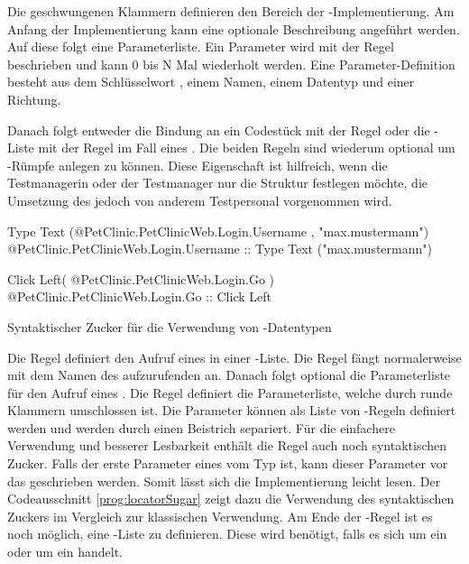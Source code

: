 \SuperPar
Die geschwungenen Klammern definieren den Bereich der -Implementierung. Am Anfang der Implementierung kann eine optionale Beschreibung angeführt werden. Auf diese folgt eine Parameterliste. Ein Parameter wird mit der Regel  beschrieben und kann 0 bis N Mal wiederholt werden. Eine Parameter-Definition besteht aus dem Schlüsselwort , einem Namen, einem Datentyp und einer Richtung.

\SuperPar
Danach folgt entweder die Bindung an ein Codestück mit der Regel  oder die -Liste mit der Regel  im Fall eines . Die beiden Regeln sind wiederum optional um -Rümpfe anlegen zu können. Diese Eigenschaft ist hilfreich, wenn die Testmanagerin oder der Testmanager nur die Struktur festlegen möchte, die Umsetzung des  jedoch von anderem Testpersonal vorgenommen wird. 

\begin{program}
\begin{JavaCode}
  Type Text (@PetClinic.PetClinicWeb.Login.Username , "max.mustermann")
	@PetClinic.PetClinicWeb.Login.Username :: Type Text ("max.mustermann")
	
	
	Click Left( @PetClinic.PetClinicWeb.Login.Go )
  @PetClinic.PetClinicWeb.Login.Go :: Click Left
\end{JavaCode}
\caption{Syntaktischer Zucker für die Verwendung von -Datentypen}
\label{prog:locatorSugar}
\end{program}

\SuperPar
Die Regel  definiert den Aufruf eines  in einer -Liste. Die Regel fängt normalerweise mit dem Namen des aufzurufenden  an. Danach folgt optional die Parameterliste für den Aufruf eines . Die Regel  definiert die Parameterliste, welche durch runde Klammern umschlossen ist. Die Parameter können als Liste von -Regeln definiert werden und werden durch einen Beistrich separiert. Für die einfachere Verwendung und besserer Lesbarkeit enthält die Regel  auch noch syntaktischen Zucker. Falls der erste Parameter eines  vom Typ  ist, kann dieser Parameter vor das  geschrieben werden. Somit lässt sich die Implementierung leicht lesen. Der Codeausschnitt \ref{prog:locatorSugar} zeigt dazu die Verwendung des syntaktischen Zuckers im Vergleich zur klassischen Verwendung. Am Ende der -Regel ist es noch möglich, eine -Liste zu definieren. Diese wird benötigt, falls es sich um ein  oder um ein  handelt.

